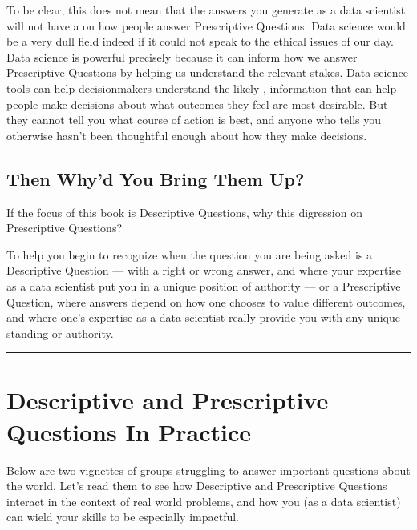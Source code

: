 \documentclass[letterpaper,10pt,english]{jupyterBook}
\begin{document}
\sphinxAtStartPar
To be clear, this does not mean that the answers you generate as a data scientist will not have a  on how people answer Prescriptive Questions. Data science would be a very dull field indeed if it could not speak to the ethical issues of our day. Data science is powerful precisely because it can inform how we answer Prescriptive Questions by helping us understand the relevant stakes. Data science tools can help decision\sphinxhyphen{}makers understand the likely , information that can help people make  decisions about what outcomes they feel are most desirable. But they cannot tell you what course of action is best, and anyone who tells you otherwise hasn’t been thoughtful enough about how they make decisions.


\subsection{Then Why’d You Bring Them Up?}
\label{\detokenize{30_questions/05_descriptive_v_prescriptive:then-why-d-you-bring-them-up}}
\sphinxAtStartPar
If the focus of this book is Descriptive Questions, why this digression on Prescriptive Questions?

\sphinxAtStartPar
To help you begin to recognize when the question you are being asked is a Descriptive Question — with a right or wrong answer, and where your expertise as a data scientist put you in a unique position of authority — or a Prescriptive Question, where answers depend on how one chooses to value different outcomes, and where one’s expertise as a data scientist really  provide you with any unique standing or authority.


\bigskip\hrule\bigskip


\sphinxstepscope


\section{Descriptive and Prescriptive Questions In Practice}
\label{\detokenize{30_questions/06_descriptive_prescriptive_examples:descriptive-and-prescriptive-questions-in-practice}}\label{\detokenize{30_questions/06_descriptive_prescriptive_examples::doc}}
\sphinxAtStartPar
Below are two vignettes of groups struggling to answer important questions about the world. Let’s read them to see how Descriptive and Prescriptive Questions interact in the context of real world problems, and how you (as a data scientist) can wield your skills to be especially impactful.
\end{document}
